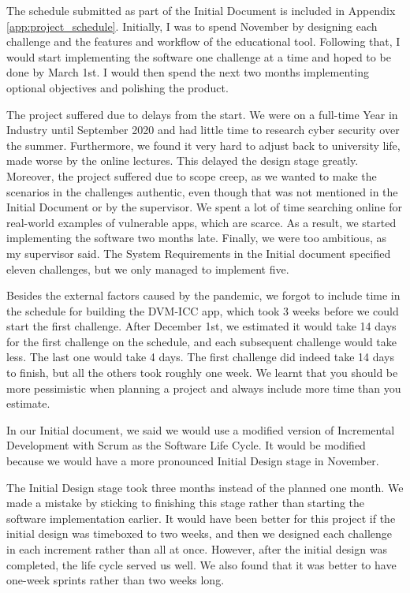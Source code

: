 	The schedule submitted as part of the Initial Document is included in Appendix \ref{app:project_schedule}. Initially, I was to spend November by designing each challenge and the features and workflow of the educational tool. Following that, I would start implementing the software one challenge at a time and hoped to be done by March 1st. I would then spend the next two months implementing optional objectives and polishing the product.
	
	The project suffered due to delays from the start. We were on a full-time Year in Industry until September 2020 and had little time to research cyber security over the summer. Furthermore, we found it very hard to adjust back to university life, made worse by the online lectures. This delayed the design stage greatly. Moreover, the project suffered due to scope creep, as we wanted to make the scenarios in the challenges authentic, even though that was not mentioned in the Initial Document or by the supervisor. We spent a lot of time searching online for real-world examples of vulnerable apps, which are scarce. As a result, we started implementing the software two months late. Finally, we were too ambitious, as my supervisor said. The System Requirements in the Initial document specified eleven challenges, but we only managed to implement five.
	
	Besides the external factors caused by the pandemic, we forgot to include time in the schedule for building the DVM-ICC app, which took 3 weeks before we could start the first challenge. After December 1st, we estimated it would take 14 days for the first challenge on the schedule, and each subsequent challenge would take less. The last one would take 4 days. The first challenge did indeed take 14 days to finish, but all the others took roughly one week. We learnt that you should be more pessimistic when planning a project and always include more time than you estimate.
	    
    In our Initial document, we said we would use a modified version of Incremental Development with Scrum as the Software Life Cycle. It would be modified because we would have a more pronounced Initial Design stage in November.
	
	The Initial Design stage took three months instead of the planned one month. We made a mistake by sticking to finishing this stage rather than starting the software implementation earlier. It would have been better for this project if the initial design was timeboxed to two weeks, and then we designed each challenge in each increment rather than all at once. However, after the initial design was completed, the life cycle served us well. We also found that it was better to have one-week sprints rather than two weeks long.
	
